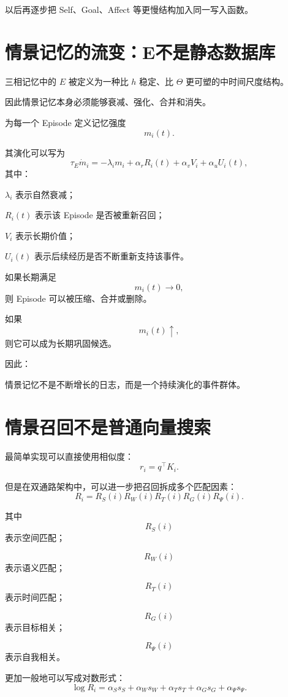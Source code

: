 以后再逐步把 Self、Goal、Affect 等更慢结构加入同一写入函数。

\section{情景记忆的流变：E不是静态数据库}

三相记忆中的 $E$ 被定义为一种比 $h$ 稳定、比 $\Theta$ 更可塑的中时间尺度结构。

因此情景记忆本身必须能够衰减、强化、合并和消失。

为每一个 Episode 定义记忆强度
\[
m_i(t).
\]

其演化可以写为
\[
\boxed{
\tau_E\dot m_i
=
-\lambda_i m_i
+
\alpha_r R_i(t)
+
\alpha_v V_i
+
\alpha_u U_i(t),
}
\]
其中：

$\lambda_i$ 表示自然衰减；

$R_i(t)$ 表示该 Episode 是否被重新召回；

$V_i$ 表示长期价值；

$U_i(t)$ 表示后续经历是否不断重新支持该事件。

如果长期满足
\[
m_i(t)\rightarrow0,
\]
则 Episode 可以被压缩、合并或删除。

如果
\[
m_i(t)\uparrow,
\]
则它可以成为长期巩固候选。

因此：
\begin{statementbox}
\centering
{}
\end{statementbox}

情景记忆不是不断增长的日志，而是一个持续演化的事件群体。

\section{情景召回不是普通向量搜索}

最简单实现可以直接使用相似度：
\[
r_i=q^\top K_i.
\]

但是在双通路架构中，可以进一步把召回拆成多个匹配因素：
\[
\boxed{
R_i
=
R_S(i)
R_W(i)
R_T(i)
R_G(i)
R_\Psi(i).
}
\]

其中
\[
R_S(i)
\]
表示空间匹配；

\[
R_W(i)
\]
表示语义匹配；

\[
R_T(i)
\]
表示时间匹配；

\[
R_G(i)
\]
表示目标相关；

\[
R_\Psi(i)
\]
表示自我相关。

更加一般地可以写成对数形式：
\[
\log R_i
=
\alpha_S s_S
+
\alpha_W s_W
+
\alpha_T s_T
+
\alpha_G s_G
+
\alpha_\Psi s_\Psi.
\]

